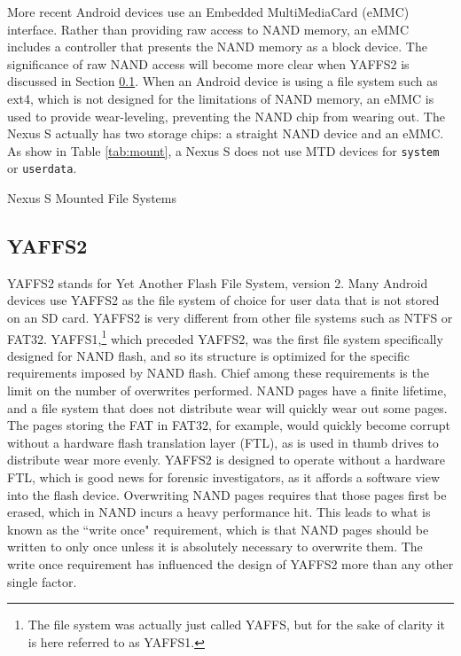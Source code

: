 More recent Android devices use an Embedded MultiMediaCard (eMMC) interface. Rather than providing raw access to NAND memory, an
eMMC includes a controller that presents the NAND memory as a block device. The significance of raw NAND access will become more
clear when YAFFS2 is discussed in Section \ref{sec:yaffs2}.  When an Android device is using a file system such as ext4, which is
not designed for the limitations of NAND memory, an eMMC is used to provide wear-leveling, preventing the NAND chip from wearing
out.  The Nexus S actually has two storage chips: a straight NAND device and an eMMC. As show in Table \ref{tab:mount}, a Nexus S
does not use MTD devices for \texttt{system} or \texttt{userdata}. 
\begin{table}[htb]
\lstset{numbers=none}

\caption{Nexus S Mounted File Systems}
\label{tab:mount}
\end{table}	

\subsection{YAFFS2} 
\label{sec:yaffs2}
YAFFS2 stands for Yet Another Flash File System, version 2. Many Android devices use YAFFS2 as the file system of choice for user
data that is not stored on an SD card.  YAFFS2 is very different from other file systems such as NTFS or FAT32.
YAFFS1,\footnote{The file system was actually just called YAFFS, but for the sake of clarity it is here referred to as YAFFS1.}
which preceded YAFFS2,  was the first file system specifically designed for NAND flash, and so its structure is optimized for the
specific requirements imposed by NAND flash.  Chief among these requirements is the limit on the number of overwrites performed.
NAND pages have a finite lifetime, and a file system that does not distribute wear will quickly wear out some pages.  The pages
storing the FAT in FAT32, for example, would quickly become corrupt without a hardware flash translation layer (FTL), as is used in
thumb drives to distribute wear more evenly.  YAFFS2 is designed to operate without a hardware FTL, which is good news for forensic
investigators, as it affords a software view into the flash device.  Overwriting NAND pages requires that those pages first be
erased, which in NAND incurs a heavy performance hit.  This leads to what is known as the ``write once" requirement, which is that
NAND pages should be written to only once unless it is absolutely necessary to overwrite them. The write once requirement has
influenced the design of YAFFS2 more than any other single factor.

